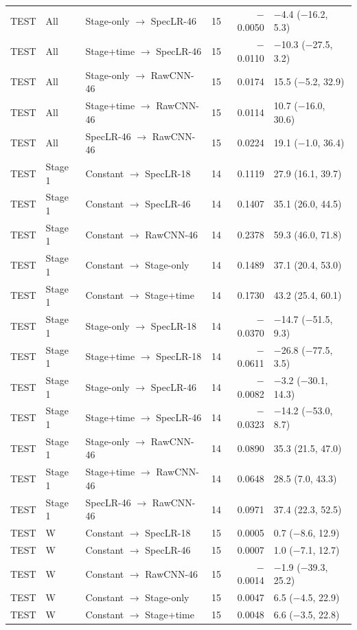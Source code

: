 {{\begin{longtable}{@{}lllrrl@{}}
TEST & All & Stage-only $\to$ SpecLR-46 & 15 & $-$0.0050 & $-$4.4 ($-$16.2, 5.3) \\
TEST & All & Stage+time $\to$ SpecLR-46 & 15 & $-$0.0110 & $-$10.3 ($-$27.5, 3.2) \\
TEST & All & Stage-only $\to$ RawCNN-46 & 15 & 0.0174 & 15.5 ($-$5.2, 32.9) \\
TEST & All & Stage+time $\to$ RawCNN-46 & 15 & 0.0114 & 10.7 ($-$16.0, 30.6) \\
TEST & All & SpecLR-46 $\to$ RawCNN-46 & 15 & 0.0224 & 19.1 ($-$1.0, 36.4) \\
\addlinespace[1pt]
TEST & Stage 1 & Constant $\to$ SpecLR-18 & 14 & 0.1119 & 27.9 (16.1, 39.7) \\
TEST & Stage 1 & Constant $\to$ SpecLR-46 & 14 & 0.1407 & 35.1 (26.0, 44.5) \\
TEST & Stage 1 & Constant $\to$ RawCNN-46 & 14 & 0.2378 & 59.3 (46.0, 71.8) \\
TEST & Stage 1 & Constant $\to$ Stage-only & 14 & 0.1489 & 37.1 (20.4, 53.0) \\
TEST & Stage 1 & Constant $\to$ Stage+time & 14 & 0.1730 & 43.2 (25.4, 60.1) \\
TEST & Stage 1 & Stage-only $\to$ SpecLR-18 & 14 & $-$0.0370 & $-$14.7 ($-$51.5, 9.3) \\
TEST & Stage 1 & Stage+time $\to$ SpecLR-18 & 14 & $-$0.0611 & $-$26.8 ($-$77.5, 3.5) \\
TEST & Stage 1 & Stage-only $\to$ SpecLR-46 & 14 & $-$0.0082 & $-$3.2 ($-$30.1, 14.3) \\
TEST & Stage 1 & Stage+time $\to$ SpecLR-46 & 14 & $-$0.0323 & $-$14.2 ($-$53.0, 8.7) \\
TEST & Stage 1 & Stage-only $\to$ RawCNN-46 & 14 & 0.0890 & 35.3 (21.5, 47.0) \\
TEST & Stage 1 & Stage+time $\to$ RawCNN-46 & 14 & 0.0648 & 28.5 (7.0, 43.3) \\
TEST & Stage 1 & SpecLR-46 $\to$ RawCNN-46 & 14 & 0.0971 & 37.4 (22.3, 52.5) \\
\addlinespace[1pt]
TEST & W & Constant $\to$ SpecLR-18 & 15 & 0.0005 & 0.7 ($-$8.6, 12.9) \\
TEST & W & Constant $\to$ SpecLR-46 & 15 & 0.0007 & 1.0 ($-$7.1, 12.7) \\
TEST & W & Constant $\to$ RawCNN-46 & 15 & $-$0.0014 & $-$1.9 ($-$39.3, 25.2) \\
TEST & W & Constant $\to$ Stage-only & 15 & 0.0047 & 6.5 ($-$4.5, 22.9) \\
TEST & W & Constant $\to$ Stage+time & 15 & 0.0048 & 6.6 ($-$3.5, 22.8) \\

\end{longtable}}}
